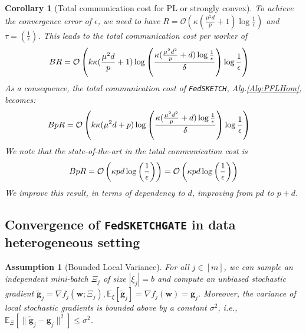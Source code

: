 \documentclass{article}
\newtheorem{corollary}{Corollary}
\newtheorem{assumption}{Assumption}
\begin{document}
\begin{corollary}[Total communication cost for PL or strongly convex]
To achieve the convergence error of $\epsilon$, we need to have $R=\mathcal{O}\left(\kappa(\frac{\mu^2d}{p}+1)\log\frac{1}{\epsilon}\right)$ and $\tau=\left(\frac{1}{\epsilon}\right)$. This leads to the total communication cost per worker of 
\begin{align}\notag
BR&=\mathcal{O}\left(k\kappa(\frac{\mu^2d}{p}+1)\log\left(\frac{\kappa(\frac{\mu^2d^2}{p}+d)\log\frac{1}{\epsilon}}{\delta}\right)\log\frac{1}{\epsilon} \right)
\end{align}
As a consequence, the total communication cost of \texttt{FedSKETCH}, Alg.\ref{Alg:PFLHom}, becomes:
\begin{align}\notag
BpR&=\mathcal{O}\left(k\kappa(\mu^2d+p)\log\left(\frac{\kappa(\frac{\mu^2d^2}{p}+d)\log\frac{1}{\epsilon}}{\delta}\right)\log\frac{1}{\epsilon} \right)
\end{align}
We note that the state-of-the-art in \cite{karimireddy2019scaffold} the total communication cost is 
\begin{align}\notag
    BpR=\mathcal{O}\left(\kappa pd\log\left(\frac{1}{\epsilon}\right) \right)=\mathcal{O}\left(\kappa pd\log\left(\frac{1}{\epsilon}\right)\right) 
\end{align}
We improve this result, in terms of dependency to $d$, improving from $pd$ to $p+d$.
\end{corollary}


\subsection{Convergence of  \texttt{FedSKETCHGATE} in data heterogeneous setting} 
\begin{assumption}[Bounded Local Variance]\label{Assu:2}
For all $j\in [m]$, we can sample an independent mini-batch $\Xi_j$   of size $|{\xi}_j| = b$ and compute an unbiased stochastic gradient $\tilde{\mathbf{g}}_j = \nabla f_j(\boldsymbol{w}; \Xi_j), \mathbb{E}_{\xi}[\tilde{\mathbf{g}}_j] = \nabla f_{j}(\boldsymbol{w})={\mathbf{g}}_j$. Moreover, the variance of local stochastic gradients is bounded above by a constant $\sigma^2$, i.e., $
\mathbb{E}_{\Xi}\left[\|\tilde{\mathbf{g}}_j-{\mathbf{g}}_j\|^2\right]\leq \sigma^2$.
\end{assumption}
\end{document}
